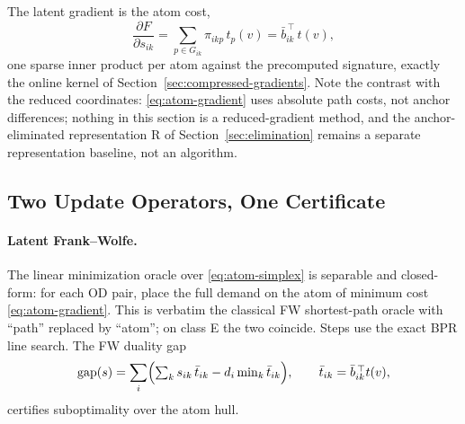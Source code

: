 The latent gradient is the atom cost,
\begin{equation}
\label{eq:atom-gradient}
\frac{\partial F}{\partial s_{ik}}
= \sum_{p \in G_{ik}} \pi_{ikp}\, t_p(v)
= \bar b_{ik}^{\,\top}\, t(v),
\end{equation}
one sparse inner product per atom against the precomputed signature,
exactly the online kernel of Section~\ref{sec:compressed-gradients}.
Note the contrast with the reduced coordinates: \eqref{eq:atom-gradient}
uses absolute path costs, not anchor differences; nothing in this
section is a reduced-gradient method, and the anchor-eliminated
representation R of Section~\ref{sec:elimination} remains a separate
representation baseline, not an algorithm.

\subsection{Two Update Operators, One Certificate}
\label{sec:two-operators}

\paragraph{Latent Frank--Wolfe.}
The linear minimization oracle over \eqref{eq:atom-simplex} is
separable and closed-form: for each OD pair, place the full demand on
the atom of minimum cost \eqref{eq:atom-gradient}. This is verbatim the
classical FW shortest-path oracle with ``path'' replaced by ``atom''; on
class E the two coincide. Steps use the exact BPR line search. The FW
duality gap
\begin{equation}
\label{eq:fw-gap}
\mathrm{gap}(s)
= \sum_i \Bigl( \textstyle\sum_k s_{ik}\, \bar t_{ik}
  - d_i \min_k \bar t_{ik} \Bigr),
\qquad \bar t_{ik} = \bar b_{ik}^{\,\top} t(v),
\end{equation}
certifies suboptimality over the atom hull.

